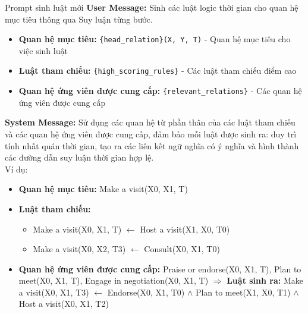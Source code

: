 \begin{promptbox}{Prompt sinh luật mới}
\textbf{User Message:}
Sinh các luật logic thời gian cho quan hệ mục tiêu thông qua Suy luận từng bước.
\begin{itemize}
    \item \textbf{Quan hệ mục tiêu:} \texttt{\{head\_relation\}(X, Y, T)} - Quan hệ mục tiêu cho việc sinh luật
    \item \textbf{Luật tham chiếu:} \texttt{\{high\_scoring\_rules\}} - Các luật tham chiếu điểm cao
    \item \textbf{Quan hệ ứng viên được cung cấp:} \texttt{\{relevant\_relations\}} - Các quan hệ ứng viên được cung cấp
\end{itemize}

\textbf{System Message:} Sử dụng các quan hệ từ phần thân của các luật tham chiếu và các quan hệ ứng viên được cung cấp, đảm bảo mỗi luật được sinh ra: duy trì tính nhất quán thời gian, tạo ra các liên kết ngữ nghĩa có ý nghĩa và hình thành các đường dẫn suy luận thời gian hợp lệ.\\
Ví dụ:

\begin{itemize}
    \item \textbf{Quan hệ mục tiêu:} Make a visit(X0, X1, T)
    \item \textbf{Luật tham chiếu:}
    \begin{itemize}
        \item Make a visit(X0, X1, T) $\leftarrow$ Host a visit(X1, X0, T0)
        \item Make a visit(X0, X2, T3) $\leftarrow$ Consult(X0, X1, T0)
    \end{itemize}
    \item \textbf{Quan hệ ứng viên được cung cấp:} Praise or endorse(X0, X1, T), Plan to meet(X0, X1, T), Engage in negotiation(X0, X1, T)
    $\Rightarrow$ \textbf{Luật sinh ra:} Make a visit(X0, X1, T3) $\leftarrow$ Endorse(X0, X1, T0) $\land$ Plan to meet(X1, X0, T1) $\land$ Host a visit(X0, X1, T2)
\end{itemize}
\end{promptbox}

    


